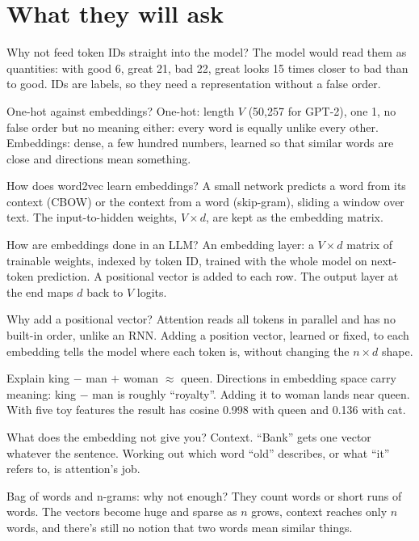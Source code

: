 \section{What they will ask}

\begin{iq}[\core]{Why not feed token IDs straight into the model?}
The model would read them as quantities: with good 6, great 21, bad 22, great looks 15 times closer to bad than to good. IDs are labels, so they need a representation without a false order.
\end{iq}

\begin{iq}[\core]{One-hot against embeddings?}
One-hot: length $V$ (50,257 for GPT-2), one 1, no false order but no meaning either: every word is equally unlike every other. Embeddings: dense, a few hundred numbers, learned so that similar words are close and directions mean something.
\end{iq}

\begin{iq}[\core]{How does word2vec learn embeddings?}
A small network predicts a word from its context (CBOW) or the context from a word (skip-gram), sliding a window over text. The input-to-hidden weights, $V \times d$, are kept as the embedding matrix.
\end{iq}

\begin{iq}[\core]{How are embeddings done in an LLM?}
An embedding layer: a $V \times d$ matrix of trainable weights, indexed by token ID, trained with the whole model on next-token prediction. A positional vector is added to each row. The output layer at the end maps $d$ back to $V$ logits.
\end{iq}

\begin{iq}[\core]{Why add a positional vector?}
Attention reads all tokens in parallel and has no built-in order, unlike an RNN. Adding a position vector, learned or fixed, to each embedding tells the model where each token is, without changing the $n \times d$ shape.
\end{iq}

\begin{iq}{Explain king $-$ man $+$ woman $\approx$ queen.}
Directions in embedding space carry meaning: king $-$ man is roughly ``royalty''. Adding it to woman lands near queen. With five toy features the result has cosine 0.998 with queen and 0.136 with cat.
\end{iq}

\begin{iq}{What does the embedding not give you?}
Context. ``Bank'' gets one vector whatever the sentence. Working out which word ``old'' describes, or what ``it'' refers to, is attention's job.
\end{iq}

\begin{iq}{Bag of words and n-grams: why not enough?}
They count words or short runs of words. The vectors become huge and sparse as $n$ grows, context reaches only $n$ words, and there's still no notion that two words mean similar things.
\end{iq}
